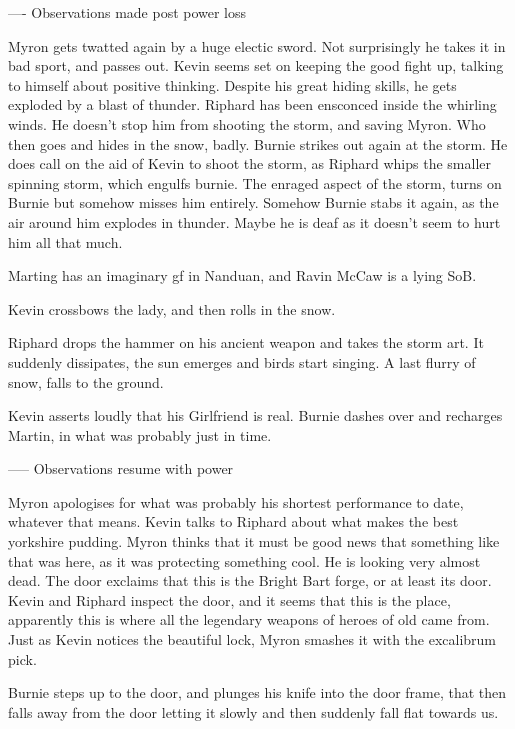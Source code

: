 ---- Observations made post power loss\medskip

Myron gets twatted again by a huge electic sword. Not surprisingly he takes it in bad sport, and passes out. Kevin seems set on keeping the good fight up, talking to himself about positive thinking. Despite his great hiding skills, he gets exploded by a blast of thunder. Riphard has been ensconced inside the whirling winds. He doesn't stop him from shooting the storm, and saving Myron. Who then goes and hides in the snow, badly. Burnie strikes out again at the storm. He does call on the aid of Kevin to shoot the storm, as Riphard whips the smaller spinning storm, which engulfs burnie. The enraged aspect of the storm, turns on Burnie but somehow misses him entirely. Somehow Burnie stabs it again, as the air around him explodes in thunder. Maybe he is deaf as it doesn't seem to hurt him all that much.\medskip

Marting has an imaginary gf in Nanduan, and Ravin McCaw is a lying SoB.\medskip

Kevin crossbows the lady, and then rolls in the snow.\medskip

Riphard drops the hammer on his ancient weapon and takes the storm art. It suddenly dissipates, the sun emerges and birds start singing. A last flurry of snow, falls to the ground.\medskip

Kevin asserts loudly that his Girlfriend is real. Burnie dashes over and recharges Martin, in what was probably just in time.\medskip

----- Observations resume with power\medskip

Myron apologises for what was probably his shortest performance to date, whatever that means. Kevin talks to Riphard about what makes the best yorkshire pudding. Myron thinks that it must be good news that something like that was here, as it was protecting something cool. He is looking very almost dead. The door exclaims that this is the Bright Bart forge, or at least its door. Kevin and Riphard inspect the door, and it seems that this is the place, apparently this is where all the legendary weapons of heroes of old came from. Just as Kevin notices the beautiful lock, Myron smashes it with the excalibrum pick.\medskip

Burnie steps up to the door, and plunges his knife into the door frame, that then falls away from the door letting it slowly and then suddenly fall flat towards us.\medskip

